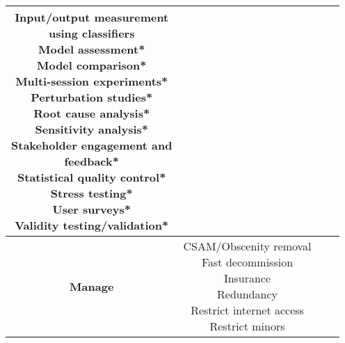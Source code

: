 \documentclass[fleqn]{article}
\begin{document}
\begin{landscape}
\begin{table}[H]
\begin{tabular}{|c|c|c|c|}
{			\textbullet\hspace{3pt} Input/output measurement\\\hspace{10pt}using classifiers \\ 
			\textbullet\hspace{3pt} Model assessment*\\  	
			\textbullet\hspace{3pt} Model comparison*\\  	
			\textbullet\hspace{3pt} Multi-session experiments*\\  		
			\textbullet\hspace{3pt} Perturbation studies*\\  				
			\textbullet\hspace{3pt} Root cause analysis*\\  	
			\textbullet\hspace{3pt} Sensitivity analysis*\\  	
			\textbullet\hspace{3pt} Stakeholder engagement and \\\hspace{10pt}feedback*\\  	
			\textbullet\hspace{3pt} Statistical quality control*\\  	
			\textbullet\hspace{3pt} Stress testing*\\  		
			\textbullet\hspace{3pt} User surveys*\\  	
			\textbullet\hspace{3pt} Validity testing/validation*\\ 
		}
		\\
		\hline		
		\textbf{Manage} & \makecell[l]{	
			\textbullet\hspace{3pt} CSAM/Obscenity removal \\ 	
			\textbullet\hspace{3pt} Fast decommission \\ 	
			\textbullet\hspace{3pt} Insurance \\ 	
			\textbullet\hspace{3pt} Redundancy \\ 	
			\textbullet\hspace{3pt} Restrict internet access \\ 	
			\textbullet\hspace{3pt} Restrict minors \\ 	
}
\end{tabular}
\end{table}
\end{landscape}
\end{document}
